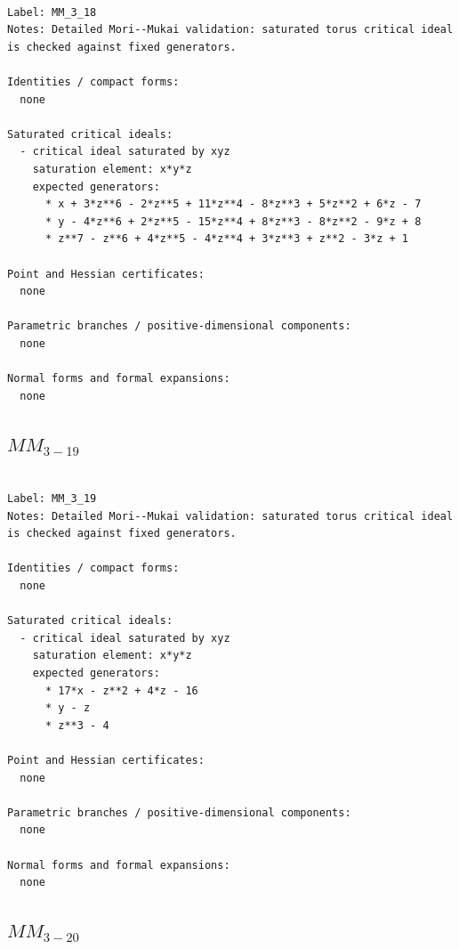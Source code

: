 \documentclass[10pt,a4paper]{article}
\begin{document}
\begin{lstlisting}

Label: MM_3_18
Notes: Detailed Mori--Mukai validation: saturated torus critical ideal is checked against fixed generators.

Identities / compact forms:
  none

Saturated critical ideals:
  - critical ideal saturated by xyz
    saturation element: x*y*z
    expected generators:
      * x + 3*z**6 - 2*z**5 + 11*z**4 - 8*z**3 + 5*z**2 + 6*z - 7
      * y - 4*z**6 + 2*z**5 - 15*z**4 + 8*z**3 - 8*z**2 - 9*z + 8
      * z**7 - z**6 + 4*z**5 - 4*z**4 + 3*z**3 + z**2 - 3*z + 1

Point and Hessian certificates:
  none

Parametric branches / positive-dimensional components:
  none

Normal forms and formal expansions:
  none

\end{lstlisting}

\subsection*{$ MM_{3-19} $}

\begin{lstlisting}

Label: MM_3_19
Notes: Detailed Mori--Mukai validation: saturated torus critical ideal is checked against fixed generators.

Identities / compact forms:
  none

Saturated critical ideals:
  - critical ideal saturated by xyz
    saturation element: x*y*z
    expected generators:
      * 17*x - z**2 + 4*z - 16
      * y - z
      * z**3 - 4

Point and Hessian certificates:
  none

Parametric branches / positive-dimensional components:
  none

Normal forms and formal expansions:
  none

\end{lstlisting}

\subsection*{$ MM_{3-20} $}
\end{document}
